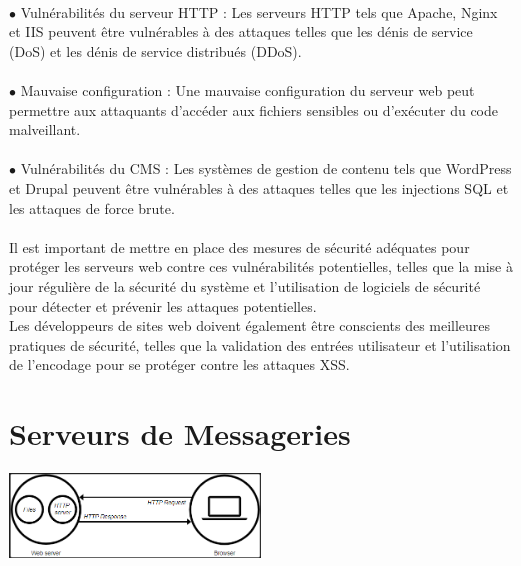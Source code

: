 \paragraph{ }
$\bullet$ Vulnérabilités du serveur HTTP : Les serveurs HTTP tels que Apache, Nginx et IIS peuvent être vulnérables à des attaques telles que les dénis de service (DoS) et les dénis de service distribués (DDoS).
\paragraph{ }
$\bullet$ Mauvaise configuration : Une mauvaise configuration du serveur web peut permettre aux attaquants d'accéder aux fichiers sensibles ou d'exécuter du code malveillant.
\paragraph{ }
$\bullet$ Vulnérabilités du CMS : Les systèmes de gestion de contenu tels que WordPress et Drupal peuvent être vulnérables à des attaques telles que les injections SQL et les attaques de force brute.\\
\paragraph{ }
Il est important de mettre en place des mesures de sécurité adéquates pour protéger les serveurs web contre ces vulnérabilités potentielles, telles que la mise à jour régulière de la sécurité du système et l'utilisation de logiciels de sécurité pour détecter et prévenir les attaques potentielles. \\Les développeurs de sites web doivent également être conscients des meilleures pratiques de sécurité, telles que la validation des entrées utilisateur et l'utilisation de l'encodage pour se protéger contre les attaques XSS.\\


\section{Serveurs de Messageries}
\vspace{4mm}
\paragraph{
	\includegraphics[width=0.5\textwidth]{Server_web.png}}
